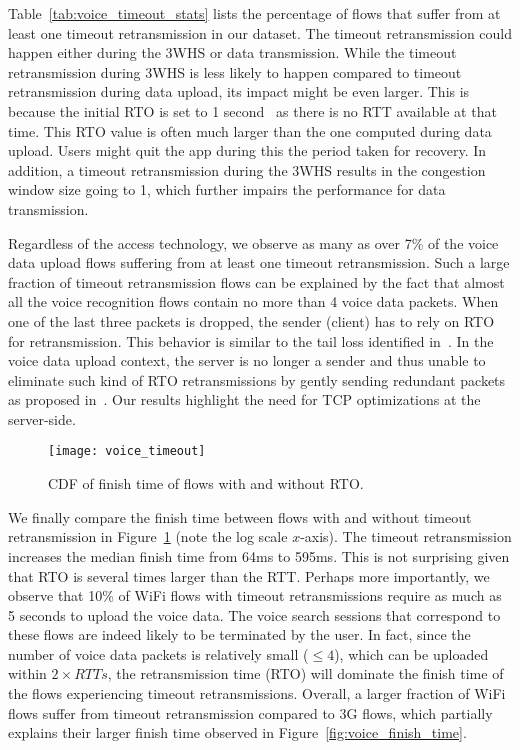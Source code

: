 Table~\ref{tab:voice_timeout_stats} lists the percentage of flows that suffer from at least one timeout retransmission in our dataset. The timeout retransmission could happen either during the 3WHS or data transmission. While the timeout retransmission during 3WHS is less likely to happen compared to timeout retransmission during data upload, its impact might be even larger. This is because the initial RTO is set to 1 second~\cite{rfc62982011computing} as there is no RTT available at that time. This RTO value is often much larger than the one computed during data upload. Users might quit the app during this the period taken for recovery. In addition, a timeout retransmission during the 3WHS results in the congestion window size going to 1, which further impairs the performance for data transmission.

Regardless of the access technology, we observe as many as over 7\% of the voice data upload flows suffering from at least one timeout retransmission. Such a large fraction of timeout retransmission flows can be explained by the fact that almost all the voice recognition flows contain no more than 4 voice data packets. When one of the last three packets is dropped, the sender (\ie client) has to rely on RTO for retransmission. This behavior is similar to the tail loss identified in~\cite{flach2013reducing}. In the voice data upload context, the server is no longer a sender and thus unable to eliminate such kind of RTO retransmissions by gently sending redundant packets as proposed in~\cite{flach2013reducing}. Our results highlight the need for TCP optimizations at the server-side. 

\begin{figure}[th]
\centering
	\texttt{[image: voice\_timeout]}
\caption{CDF of finish time of flows with and without RTO.}
\label{fig:voice_rto}
\end{figure}

We finally compare the finish time between flows with and without timeout retransmission in Figure~\ref{fig:voice_rto} (note the log scale $x$-axis). The timeout retransmission increases the median finish time from 64ms to 595ms.  This is not surprising given that RTO is several times larger than the RTT. Perhaps more importantly, we observe that 10\% of WiFi flows with timeout retransmissions require as much as 5 seconds to upload the voice data. The voice search sessions that correspond to these flows are indeed likely to be terminated by the user. In fact, since the number of voice data packets is relatively small ($\le 4$), which can be uploaded within $2\times RTTs$, the retransmission time (\ie RTO) will dominate the finish time of the flows experiencing timeout retransmissions.  Overall, a larger fraction of WiFi flows suffer from timeout retransmission compared to 3G flows, which partially explains their larger finish time observed in Figure~\ref{fig:voice_finish_time}.

